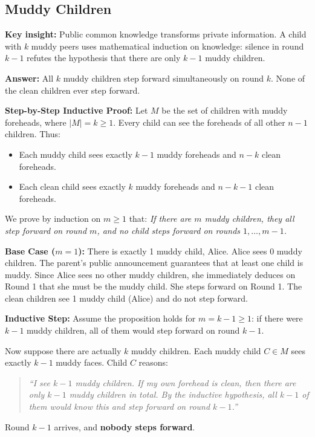 \documentclass[12pt]{article}
\newcommand{\insight}[1]{\par\medskip\noindent\textbf{Key insight:} #1}
\begin{document}
\subsection{Muddy Children}

\insight{Public common knowledge transforms private information. A child with $k$ muddy peers uses mathematical induction on knowledge: silence in round $k-1$ refutes the hypothesis that there are only $k-1$ muddy children.}

\textbf{Answer:} All $k$ muddy children step forward simultaneously on round $k$. None of the clean children ever step forward.

\textbf{Step-by-Step Inductive Proof:}
Let $M$ be the set of children with muddy foreheads, where $|M| = k \ge 1$.
Every child can see the foreheads of all other $n-1$ children. Thus:
\begin{itemize}
    \item Each muddy child sees exactly $k - 1$ muddy foreheads and $n - k$ clean foreheads.
    \item Each clean child sees exactly $k$ muddy foreheads and $n - k - 1$ clean foreheads.
\end{itemize}

We prove by induction on $m \ge 1$ that: \textit{If there are $m$ muddy children, they all step forward on round $m$, and no child steps forward on rounds $1, \dots, m-1$.}

\textbf{Base Case ($m = 1$):}
There is exactly 1 muddy child, Alice. Alice sees 0 muddy children. The parent's public announcement guarantees that at least one child is muddy. Since Alice sees no other muddy children, she immediately deduces on Round 1 that she must be the muddy child. She steps forward on Round 1. The clean children see 1 muddy child (Alice) and do not step forward.

\textbf{Inductive Step:}
Assume the proposition holds for $m = k - 1 \ge 1$: if there were $k - 1$ muddy children, all of them would step forward on round $k - 1$.

Now suppose there are actually $k$ muddy children.
Each muddy child $C \in M$ sees exactly $k - 1$ muddy faces. Child $C$ reasons:
\begin{quote}
\textit{``I see $k - 1$ muddy children. If my own forehead is clean, then there are only $k - 1$ muddy children in total. By the inductive hypothesis, all $k - 1$ of them would know this and step forward on round $k - 1$.''}
\end{quote}
Round $k - 1$ arrives, and \textbf{nobody steps forward}.
\end{document}

